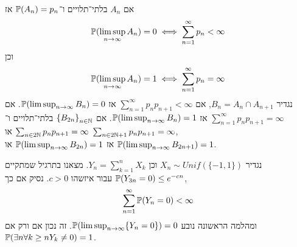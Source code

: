 \begin{example}
	אם $A_n$ בלתי־תלויים ו־$\mathbb{P}(A_n) = p_n$ אז
	\[
		\mathbb{P}(\limsup_{n \to \infty} A_n) = 0 \iff \sum_{n = 1}^{\infty} p_n < \infty
	\]
	וכן
	\[
		\mathbb{P}(\limsup_{n \to \infty} A_n) = 1 \iff \sum_{n = 1}^{\infty} p_n = \infty
	\]
	נגדיר $B_n = A_n \cap A_{n + 1}$, אם $\sum_{n = 1}^{\infty} p_n p_{n + 1} < \infty$ אז $\mathbb{P}(\limsup_{n \to \infty} B_n) = 0$.
	אם $\sum_{n = 1}^{\infty} p_n p_{n + 1} = \infty$ אז $\mathbb{P}(\limsup_{n \to \infty} B_n) = 1$.
	אם ${\{ B_{2n} \}}_{n \in \mathbb{N}}$ בלתי־תלויים ו־$\sum_{n \in 2\mathbb{N}} p_n p_{n + 1} = \infty$ או $\sum_{n \in 2\mathbb{N} + 1} p_n p_{n + 1} = \infty$, \\
	אז $\mathbb{P}(\limsup_{n \to \infty} B_{2n}) = 1$ או $\mathbb{P}(\limsup_{n \to \infty} B_{2n + 1}) = 1$.
\end{example}
\begin{example}
	נגדיר $X_n \sim Unif(\{-1, 1\})$ וכן $Y_n = \sum_{k = 1}^{n} X_k$.
	מצאנו בתרגיל שמתקיים $\mathbb{P}(Y_{3n} = 0) \le e^{-cn}$ עבור איזשהו $c > 0$.
	נסיק אם כך,
	\[
		\sum_{n = 1}^{\infty} \mathbb{P}(Y_n = 0) < \infty
	\]
	ומהלמה הראשונה נובע $\mathbb{P}(\limsup_{n \to \infty} \{ Y_n = 0 \}) = 0$.
	זה נכון אם ורק אם $\mathbb{P}(\exists n \forall k \ge n Y_k \ne 0) = 1$.
\end{example}


